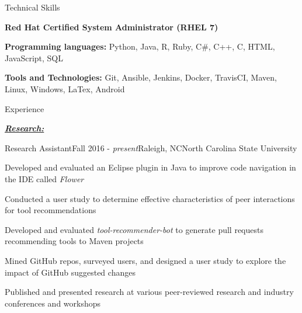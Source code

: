 \documentclass{resume} %
\begin{document}
\begin{rSection}{Technical Skills}
\vspace{-4pt}

\begin{sSubsection}
    {\small \textbf{Red Hat Certified System Administrator (RHEL 7)}}{}
\end{sSubsection}
\vspace{-9pt}

\begin{sSubsection}
    {\small \textbf{Programming languages:} Python, Java, R, Ruby, C\#, C++, C, HTML, JavaScript, SQL}{}
\end{sSubsection}
\vspace{-9pt}

\begin{sSubsection}
    {\small \textbf{Tools and Technologies:} Git, Ansible, Jenkins, Docker, TravisCI, Maven, Linux, Windows, LaTex, Android}{}
\end{sSubsection}
\vspace{-10pt}


\begin{rSection}{Experience}
\vspace{-4pt}

\underline{\textbf{\textit{Research:}}}
\vspace{-8pt}

\begin{pSubsection}{\small Research Assistant}{\small Fall 2016 - \textit{present}}{\small Raleigh, NC}{\small North Carolina State University}
\item {\small Developed and evaluated an Eclipse plugin in Java to improve code navigation in the IDE called \textit{Flower}}
\item {\small Conducted a user study to determine effective characteristics of peer interactions for tool recommendations}
\item {\small Developed and evaluated \textsl{tool-recommender-bot} to generate pull requests recommending tools to Maven projects}
\item {\small Mined GitHub repos, surveyed users, and designed a user study to explore the impact of GitHub suggested changes}
\item {\small Published and presented research at various peer-reviewed research and industry conferences and workshops}


\end{pSubsection}
\end{rSection}
\end{rSection}
\end{document}
